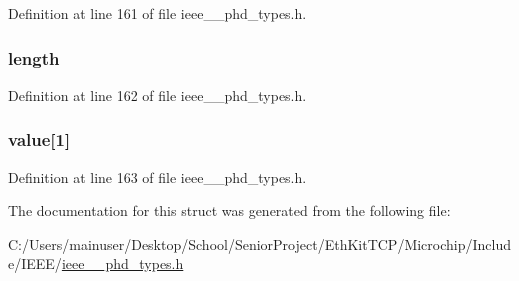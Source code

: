 Definition at line 161 of file ieee\+\_\+\_\+phd\+\_\+types.\+h.

\hypertarget{struct___production_spec_a3743679e4ff85e3e1b3fc2e59973fbb3}{}
\subsubsection[{length}]{ length}\label{struct___production_spec_a3743679e4ff85e3e1b3fc2e59973fbb3}


Definition at line 162 of file ieee\+\_\+\_\+phd\+\_\+types.\+h.

\hypertarget{struct___production_spec_a6cf86cd9ffaf1d453e5e70f09b98f3fb}{}
\subsubsection[{value}]{ value\mbox{[}1\mbox{]}}\label{struct___production_spec_a6cf86cd9ffaf1d453e5e70f09b98f3fb}


Definition at line 163 of file ieee\+\_\+\_\+phd\+\_\+types.\+h.



The documentation for this struct was generated from the following file\+:\begin{DoxyCompactItemize}
\item 
C\+:/\+Users/mainuser/\+Desktop/\+School/\+Senior\+Project/\+Eth\+Kit\+T\+C\+P/\+Microchip/\+Include/\+I\+E\+E\+E/\hyperlink{ieee__11073__phd__types_8h}{ieee\+\_\+\_\+phd\+\_\+types.\+h}\end{DoxyCompactItemize}
